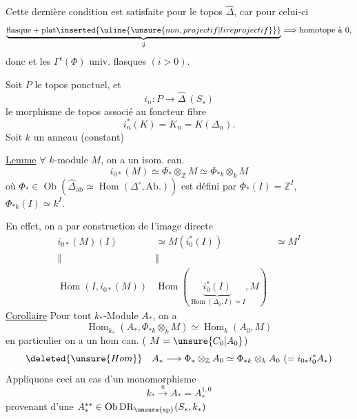 Cette dernière condition est satisfaite pour le topos  $\widehat\Delta$, car pour celui-ci
\[
\underbrace{\text{flasque}+\text{plat}\inserted{\uline{\unsure{non, projectif|lire projectif}}}}_{\Downarrow}\Longrightarrow\text{homotope à }0,
\]
donc  et les $\Gamma^i(\Phi)$ univ. flasques $(i>0)$.

Soit $P$ le topos ponctuel, et
\[
i_n:P\longrightarrow\widehat\Delta\ (S_s)
\]
le morphisme de topos associé au foncteur fibre
\[
i_n^*(K)=K_n=K(\Delta_n).
\]
Soit $k$ un anneau (constant)

\uline{Lemme} $\forall$ $k$-module $M$, on a un isom. can.
\[
i_{0*}(M)\simeq\Phi_*\otimes_{\mathbb Z}M\simeq\Phi_{*k}\otimes_k M
\]
où $\Phi_*\in\operatorname{Ob}(\widehat\Delta_{\mathrm{ab}}\simeq\operatorname{Hom}(\Delta^\circ,\mathrm{Ab.}))$ est défini par $\Phi_*(I)=\mathbb Z^I$,  $\Phi_{*k}(I)\simeq k^I$.

En effet, on a par construction de l'image directe
\[
\begin{array}{ccc}
i_{0*}(M)(I)&\simeq M(i_0^*(I))&\simeq M^I\\
\Vert&\Vert&\\
\operatorname{Hom}(I,i_{0*}(M))&\operatorname{Hom}(\underbrace{i_0^*(I)}_{\operatorname{Hom}(\Delta_0,I)\simeq I},M)&
\end{array}
\]
\uline{Corollaire} Pour tout $k_*$-Module $A_*$, on a
\[
\operatorname{Hom}_{k_*}(A_*,\Phi_{*k}\otimes_k M)\simeq\operatorname{Hom}_k(A_0,M)
\]
en particulier on a un hom can. ( $M=\unsure{C_0|A_0}$)
\[
\deleted{\unsure{Hom}}\quad A_*\longrightarrow\Phi_*\otimes_{\mathbb Z}A_0\simeq\Phi_{*k}\otimes_k A_0\ (=i_{0*}i_0^*A_*)
\]
Appliquons ceci au cas d'un monomorphisme
\[
k_*\xrightarrow{u} A_*=A_*^{1,0}
\]
provenant d'une $A_*^{**}\in\operatorname{Ob}\mathrm{DR}_{\unsure{\mathrm{sp}}}(S_s,k_*)$

